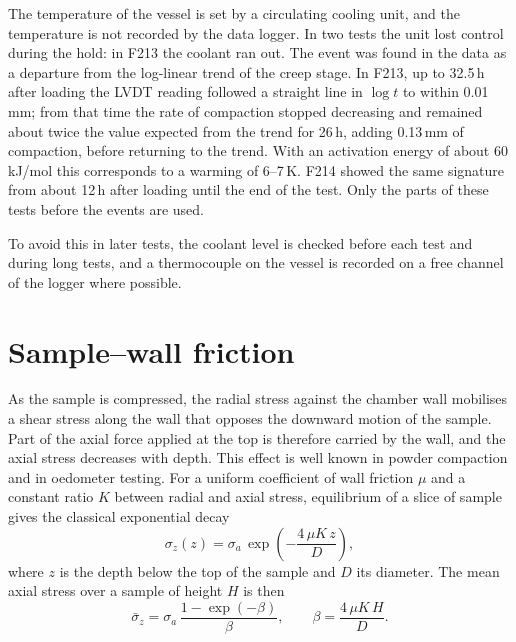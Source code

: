 The temperature of the vessel is set by a circulating cooling unit, and the temperature is not recorded by the data logger. In two tests the unit lost control during the hold: in F213 the coolant ran out. The event was found in the data as a departure from the log-linear trend of the creep stage. In F213, up to 32.5\,h after loading the LVDT reading followed a straight line in $\log t$ to within 0.01\,mm; from that time the rate of compaction stopped decreasing and remained about twice the value expected from the trend for 26\,h, adding 0.13\,mm of compaction, before returning to the trend. With an activation energy of about 60\,kJ/mol this corresponds to a warming of 6--7\,K. F214 showed the same signature from about 12\,h after loading until the end of the test. Only the parts of these tests before the events are used.

To avoid this in later tests, the coolant level is checked before each test and during long tests, and a thermocouple on the vessel is recorded on a free channel of the logger where possible.

\section{Sample--wall friction}
\label{sec:wall_friction}

As the sample is compressed, the radial stress against the chamber wall mobilises a shear stress along the wall that opposes the downward motion of the sample. Part of the axial force applied at the top is therefore carried by the wall, and the axial stress decreases with depth. This effect is well known in powder compaction and in oedometer testing. For a uniform coefficient of wall friction $\mu$ and a constant ratio $K$ between radial and axial stress, equilibrium of a slice of sample gives the classical exponential decay
\begin{equation}
    \sigma_z(z) = \sigma_a\,\exp\left(-\frac{4\,\mu K\,z}{D}\right),
    \label{eq:janssen}
\end{equation}
where $z$ is the depth below the top of the sample and $D$ its diameter. The mean axial stress over a sample of height $H$ is then
\begin{equation}
    \bar\sigma_z = \sigma_a\,\frac{1-\exp(-\beta)}{\beta}, \qquad \beta = \frac{4\,\mu K\,H}{D}.
    \label{eq:janssen_mean}
\end{equation}

